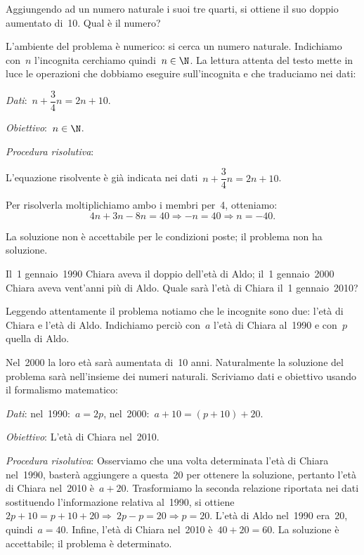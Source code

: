 
\begin{problema}
 Aggiungendo ad un numero naturale i suoi tre quarti, si ottiene il suo
doppio aumentato di~10. Qual è il numero?
\end{problema}

L'ambiente del problema è numerico: si cerca un numero
naturale. Indichiamo con~\(n\) l'incognita
cerchiamo quindi~\(n\in\N\). La lettura attenta del testo mette
in luce le operazioni che dobbiamo eseguire
sull'incognita e che traduciamo nei dati:

\emph{Dati}:~\(n+\dfrac{3}{4}n=2n+10\).

\emph{Obiettivo}:~\(n\in\N\).

\emph{Procedura risolutiva}:

L'equazione risolvente è già indicata nei dati~\(n+\dfrac{3}{4}n=2n+10\).

Per risolverla moltiplichiamo ambo i membri per~4, otteniamo:
\[4n+3n-8n=40\Rightarrow -n=40\Rightarrow n=-40.\]

La soluzione non è accettabile per le condizioni poste; il problema
non ha soluzione.

\begin{problema}
 Il~1{\textdegree} gennaio~1990 Chiara aveva il doppio
dell'età di Aldo; il~1{\textdegree} gennaio~2000
Chiara aveva vent'anni più di Aldo. Quale sarà
l'età di Chiara il~1{\textdegree} gennaio~2010?
\end{problema}

Leggendo attentamente il problema notiamo che le incognite sono due:
l'età di Chiara e l'età di Aldo.
Indichiamo perciò con~\(a\) l'età di
Chiara al~1990 e con~\(p\) quella di Aldo.

Nel~2000 la loro età sarà aumentata di~10 anni. Naturalmente la
soluzione del problema sarà nell'insieme dei numeri
naturali. Scriviamo dati e obiettivo usando il formalismo matematico:

\emph{Dati}: nel~1990:~\(a=2p\), nel~2000:~\(a+10=(p+10)+20\).

\emph{Obiettivo}: L'età di Chiara nel~2010.

\emph{Procedura risolutiva}:
Osserviamo che una volta determinata l'età di Chiara
nel~1990, basterà aggiungere a questa~20 per ottenere la soluzione,
pertanto l'età di Chiara nel~2010 è~\(a+20\).
Trasformiamo la seconda relazione riportata nei dati sostituendo
l'informazione relativa al~1990,
si ottiene~\(2p+10=p+10+20\Rightarrow~2p-p=20\Rightarrow p=20.\)
L'età di Aldo nel~1990 era~20, quindi~\(a=40\).
Infine, l'età di Chiara nel~2010 è~\(40+20=60\).
La soluzione è accettabile; il problema è determinato.

